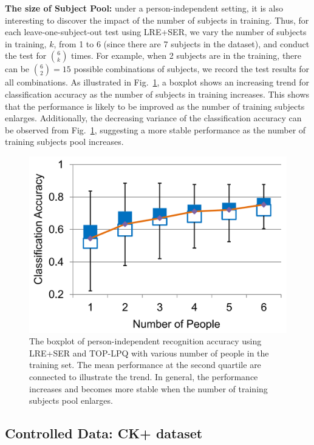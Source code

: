 \documentclass[journal]{IEEEtran}
\begin{document}
\textbf{The size of Subject Pool: } under a person-independent setting, it is also interesting to discover the impact of the number of subjects in training. Thus, for each leave-one-subject-out test using LRE+SER, we vary the number of subjects in training, $k$, from 1 to 6 (since there are 7 subjects in the dataset), and conduct the test for ${6 \choose k}$ times. For example, when 2 subjects are in the training, there can be ${6 \choose 2}=15$ possible combinations of subjects, we record the test results for all combinations. As illustrated in Fig.~\ref{fig:effect_people_num}, a boxplot shows an increasing trend for classification accuracy as the number of subjects in training increases. This shows that the performance is likely to be improved as the number of training subjects enlarges. Additionally, the decreasing variance of the classification accuracy can be observed from Fig.~\ref{fig:effect_people_num}, suggesting a more stable performance as the number of training subjects pool increases. 


\begin{figure}[htbp]
	\centering
		\includegraphics[width=.65\columnwidth]{pics/effect_people_num.png}
	\caption{The boxplot of person-independent recognition accuracy using LRE+SER and TOP-LPQ with various number of people in the training set. The mean performance at the second quartile are connected to illustrate the trend. In general, the performance increases and becomes more stable when the number of training subjects pool enlarges.}
	\label{fig:effect_people_num}
\end{figure}



\subsection{Controlled Data: CK+ dataset}
\end{document}
